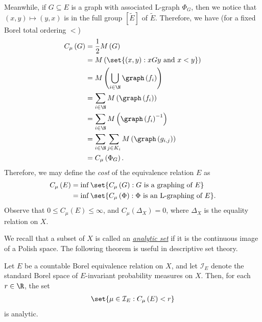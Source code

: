 \documentclass[10pt]{mypackage}
\begin{document}
Meanwhile, if $G\subseteq E$ is a graph with associated L-graph $\Phi_{G}$, then we notice that $\left( x,y \right)\mapsto \left( y,x \right)$ is in the full group $\left[ \widetilde{E} \right]$ of $ \widetilde{E} $. Therefore, we have (for a fixed Borel total ordering $<$)
\begin{align*}
  C_{\mu}\left( G \right) &= \frac{1}{2}M\left( G \right)\\
                          &= M\left( \set{\left( x,y \right) : xGy\text{ and }x < y} \right)\\
                          &= M\left( \bigcup_{i\in \N}\graph\left( f_i \right) \right)\\
                          &= \sum_{i\in \N} M\left( \graph\left( f_i \right) \right)\\
                          &= \sum_{i\in \N} M\left( \graph\left( f_i \right)^{-1} \right)\\
                          &= \sum_{i\in \N}\sum_{j\in K_i} M\left( \graph\left( g_{i,j} \right) \right)\\
                          &= C_{\mu}\left( \Phi_G \right).
\end{align*}
Therefore, we may define the \textit{cost} of the equivalence relation $E$ as
\begin{align*}
  C_{\mu}\left( E \right) &= \inf\set{C_{\mu}\left( G \right) : G\text{ is a graphing of }E}\\
                          &= \inf\set{C_{\mu}\left( \Phi \right) : \Phi\text{ is an L-graphing of }E}.
\end{align*}
Observe that $0\leq C_{\mu}\left( E \right) \leq \infty$, and $C_{\mu}\left( \Delta_X \right) = 0$, where $\Delta_X$ is the equality relation on $X$.

We recall that a subset of $X$ is called an \href{https://en.wikipedia.org/wiki/Analytic_set}{\textit{analytic set}} if it is the continuous image of a Polish space. The following theorem is useful in descriptive set theory.
\begin{proposition}
  Let $E$ be a countable Borel equivalence relation on $X$, and let $\mathcal{I}_E$ denote the standard Borel space of $E$-invariant probability measures on $X$. Then, for each $r\in \R$, the set
  \begin{align*}
    \set{\mu\in \mathcal{I}_E : C_{\mu}\left( E \right) < r}
  \end{align*}
  is analytic.
\end{proposition}
\nocite{topics_in_orbit_equivalence,classical_descriptive_set_theory,theory_countable_borel_equivalence_relations,kerr_and_li}
\printbibliography
\end{document}
